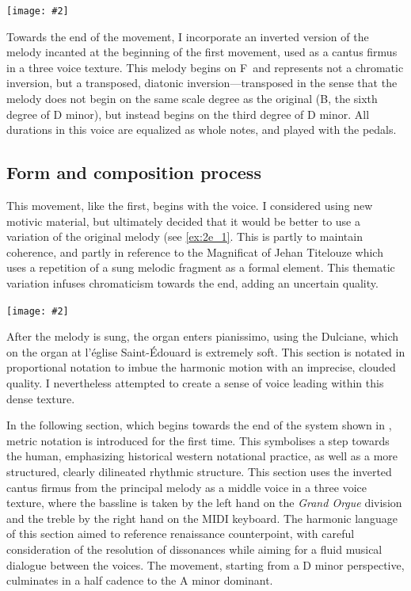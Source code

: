 \documentclass[12pt,twoside,maitrise]{dms_ks}
\newcommand{\customincludeexamples}[4][]{%
    \begin{example}[H]
        \centering
        \texttt{[image: \#2]}
        \caption{#4}
	\label{#3} 
    \end{example}
}
\theoremstyle{definition}
\begin{document}
{{\customincludeexamples[]{g7alt}{fig:g7alt}{A classic G7alt chord on the left, and my variation with a \sh7 on the right.}

Towards the end of the movement, I incorporate an inverted version of the melody incanted at the beginning of the first movement, used as a cantus firmus in a three voice texture.
This melody begins on F\na\ and represents not a chromatic inversion, but a transposed, diatonic inversion---transposed in the sense that the melody does not begin on the same scale degree as the original (B\fl, the sixth degree of D minor), but instead begins on the third degree of D minor. 
All durations in this voice are equalized as whole notes, and played with the pedals.

\subsection{Form and composition process}

This movement, like the first, begins with the voice.
I considered using new motivic material, but ultimately decided that it would be better to use a variation of the original melody (see \cref{ex:2e_1}.
This is partly to maintain coherence, and partly in reference to the Magnificat of Jehan Titelouze which uses a repetition of a sung melodic fragment as a formal element.
This thematic variation infuses chromaticism towards the end, adding an uncertain quality.

\customincludeexamples[width=\textwidth]{2e_1}{ex:2e_1}{A variation of the sung melody from the first movement (p.~2, sys.~1).}

After the melody is sung, the organ enters pianissimo, using the Dulciane, which on the organ at l'église Saint-Édouard is extremely soft.
This section is notated in proportional notation to imbue the harmonic motion with an imprecise, clouded quality.
I nevertheless attempted to create a sense of voice leading within this dense texture.

In the following section, which begins towards the end of the system shown in , metric notation is introduced for the first time.
This symbolises a step towards the human, emphasizing historical western notational practice, as well as a more structured, clearly dilineated rhythmic structure. 
This section uses the inverted cantus firmus from the principal melody as a middle voice in a three voice texture, where the bassline is taken by the left hand on the \textit{Grand Orgue} division and the treble by the right hand on the MIDI keyboard.
The harmonic language of this section aimed to reference renaissance counterpoint, with careful consideration of the resolution of dissonances while aiming for a fluid musical dialogue between the voices.
The movement, starting from a D minor perspective, culminates in a half cadence to the A minor dominant.

}}
\end{document}
